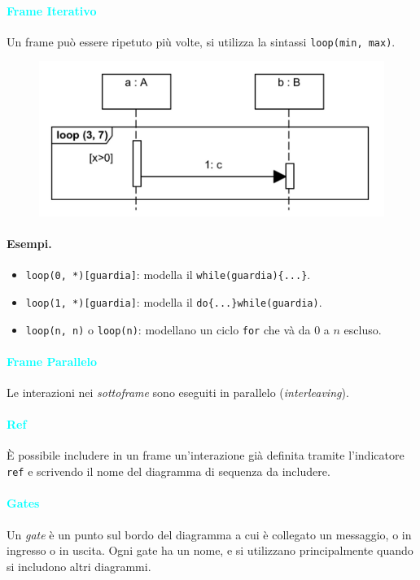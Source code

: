 \paragraph{\textcolor{cyan}{Frame Iterativo}} Un frame può essere ripetuto più volte, si utilizza
la sintassi \verb|loop(min, max)|.

\begin{figure}[H]
    \centering
    \includegraphics[scale=0.4]{img/frame_iterativo.png}
\end{figure}

\paragraph{Esempi.}

\begin{itemize}
    \item \verb|loop(0, *)[guardia]|: modella il \verb|while(guardia){...}|.
    \item \verb|loop(1, *)[guardia]|: modella il \verb|do{...}while(guardia)|.
    \item \verb|loop(n, n)| o \verb|loop(n)|: modellano un ciclo \verb|for| che và da $0$ a $n$ escluso.
\end{itemize}

\paragraph{\textcolor{cyan}{Frame Parallelo}} Le interazioni nei \emph{sottoframe} sono eseguiti
in parallelo (\emph{interleaving}).

\paragraph{\textcolor{cyan}{Ref}} È possibile includere in un frame un'interazione già definita tramite
l'indicatore \verb|ref| e scrivendo il nome del diagramma di sequenza da includere.

\paragraph{\textcolor{cyan}{Gates}} Un \emph{gate} è un punto sul bordo del diagramma a cui è
collegato un messaggio, o in ingresso o in uscita. Ogni gate ha un nome, e si utilizzano principalmente
quando si includono altri diagrammi.
